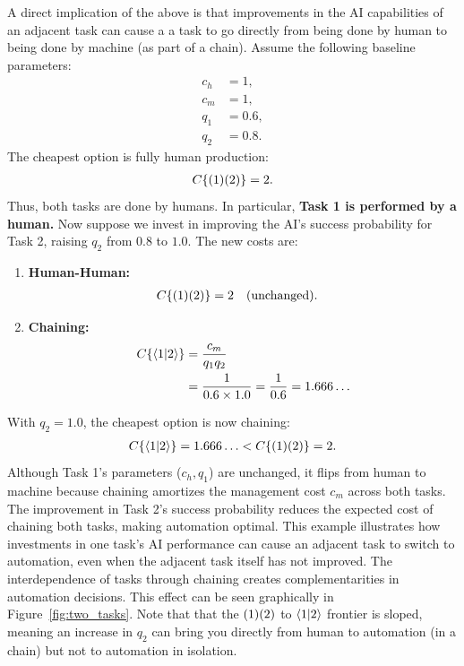\documentclass{article}
\begin{document}
A direct implication of the above is that improvements in the AI capabilities of an adjacent task can cause a a task to go directly from being done by human to being done by machine (as part of a chain).
Assume the following baseline parameters:
\begin{align*}
    c_h &= 1, \\
    c_m &= 1, \\
    q_1 &= 0.6, \\
    q_2 &= 0.8.
\end{align*}
The cheapest option is fully human production:\
\begin{align*}
    C\{ ( 1 )( 2 ) \} = 2.
\end{align*}
Thus, both tasks are done by humans. In particular, \textbf{Task 1 is performed by a human.}
Now suppose we invest in improving the AI's success probability for Task 2, raising $q_2$ from $0.8$ to $1.0$. The new costs are:
\begin{enumerate}
    \item \textbf{Human-Human:}
    \begin{align*}
        C\{ ( 1 )( 2 ) \} &= 2 \quad \text{(unchanged)}.
    \end{align*}
    \item \textbf{Chaining:}
    \begin{align*}
        C\{ \langle 1|2 \rangle \} &= \frac{c_m}{q_1 q_2} \\
        &= \frac{1}{0.6 \times 1.0} = \frac{1}{0.6} = 1.666\ldots
    \end{align*}
\end{enumerate}
With $q_2 = 1.0$, the cheapest option is now chaining:\
\begin{align*}
    C\{ \langle 1|2 \rangle \} = 1.666\ldots < C\{ ( 1 )( 2 ) \} = 2.
\end{align*}
Although Task 1's parameters ($c_h, q_1$) are unchanged, it flips from human to machine because chaining amortizes the management cost $c_m$ across both tasks. 
The improvement in Task 2's success probability reduces the expected cost of chaining both tasks, making automation optimal.
This example illustrates how investments in one task's AI performance can cause an adjacent task to switch to automation, even when the adjacent task itself has not improved. 
The interdependence of tasks through chaining creates complementarities in automation decisions.
This effect can be seen graphically in Figure~\ref{fig:two_tasks}.
Note that that the $( 1 )( 2 )$ to $\langle 1|2 \rangle$ frontier is sloped, meaning an increase in $q_2$ can bring you directly from human to automation (in a chain) but not to automation in isolation.
\end{document}
